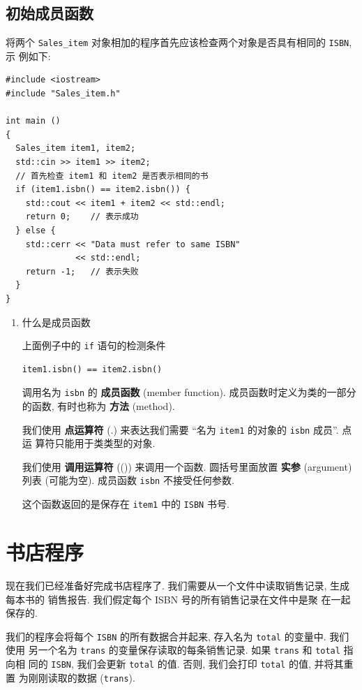 \documentclass[lang=cn]{elegantbook}
\begin{document}
\subsection{初始成员函数}
\label{sec:orgf15346f}

将两个 \texttt{Sales\_item} 对象相加的程序首先应该检查两个对象是否具有相同的 \texttt{ISBN}, 示
例如下:

\begin{verbatim}
#include <iostream>
#include "Sales_item.h"

int main ()
{
  Sales_item item1, item2;
  std::cin >> item1 >> item2;
  // 首先检查 item1 和 item2 是否表示相同的书
  if (item1.isbn() == item2.isbn()) {
    std::cout << item1 + item2 << std::endl;
    return 0;    // 表示成功
  } else {
    std::cerr << "Data must refer to same ISBN"
              << std::endl;
    return -1;   // 表示失败
  }
}
\end{verbatim}

\begin{enumerate}
\item 什么是成员函数
\label{sec:orga04ce98}

上面例子中的 \texttt{if} 语句的检测条件

\begin{verbatim}
item1.isbn() == item2.isbn()
\end{verbatim}

调用名为 \texttt{isbn} 的 \textbf{成员函数} (member function). 成员函数时定义为类的一部分的函数,
有时也称为 \textbf{方法} (method).

我们使用 \textbf{点运算符} (.) 来表达我们需要 ``名为 \texttt{item1} 的对象的 \texttt{isbn} 成员''. 点运
算符只能用于类类型的对象.

我们使用 \textbf{调用运算符} (()) 来调用一个函数. 圆括号里面放置 \textbf{实参} (argument) 列表
(可能为空). 成员函数 \texttt{isbn} 不接受任何参数.

这个函数返回的是保存在 \texttt{item1} 中的 \texttt{ISBN} 书号.
\end{enumerate}

\section{书店程序}
\label{sec:org3c5ac29}

现在我们已经准备好完成书店程序了. 我们需要从一个文件中读取销售记录, 生成每本书的
销售报告. 我们假定每个 ISBN 号的所有销售记录在文件中是聚
在一起保存的.

我们的程序会将每个 \texttt{ISBN} 的所有数据合并起来, 存入名为 \texttt{total} 的变量中. 我们使用
另一个名为 \texttt{trans} 的变量保存读取的每条销售记录. 如果 \texttt{trans} 和 \texttt{total} 指向相
同的 \texttt{ISBN}, 我们会更新 \texttt{total} 的值. 否则, 我们会打印 \texttt{total} 的值, 并将其重置
为刚刚读取的数据 (\texttt{trans}).
\end{document}
